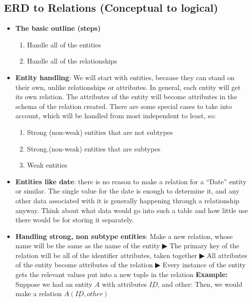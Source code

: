 \documentclass{report}
\begin{document}
    \pagebreak 
    \subsection{ERD to Relations (Conceptual to logical)}
    \begin{itemize}
        \item \textbf{The basic outline (steps)}
            \begin{enumerate}
                \item Handle all of the entities
                \item Handle all of the relationships
            \end{enumerate}
        \item \textbf{Entity handling}: We will start with entities, because they can stand on their own, unlike relationships or attributes. In general, each entity will get its own relation. The attributes of the entity will become attributes in the schema of the relation created. There are some special cases to take into account, which will be handled from most independent to least, so:
            \begin{enumerate}[label=\alph*.]
                \item Strong (non-weak) entities that are not subtypes
                \item Strong.(non-weak) entities that are subtypes
                \item Weak entities
            \end{enumerate}
        \item \textbf{Entities like date}: there is no reason to make a relation for a “Date” entity or similar. The single value for the date is enough to determine it, and any other data associated with it is generally happening through a relationship anyway. Think about what data would go into such a table and how little use there would be for storing it separately.
        \item \textbf{Handling strong, non subtype entities}: Make a new relation, whose name will be the same as the name of the entity ▶ The primary key of the relation will be all of the identifier attributes, taken together ▶ All attributes of the entity become attributes of the relation ▶ Every instance of the entity gets the relevant values put into a new tuple in the relation
            \bigbreak \noindent 
            \textbf{Example:} Suppose we had an entity $A$ with attributes $\underline{ID}$, and other:
            \bigbreak \noindent 
            Then, we would make a relation $A(\underline{ID}, other)$

\end{itemize}
\end{document}
